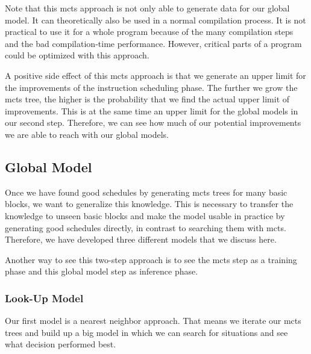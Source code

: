 Note that this \ac{mcts} approach is not only able to generate data for our global model.
It can theoretically also be used in a normal compilation process.
It is not practical to use it for a whole program because of the many compilation steps and the bad compilation-time performance.
However, critical parts of a program could be optimized with this approach.

A positive side effect of this \ac{mcts} approach is that we generate an upper limit for the improvements of the instruction scheduling phase.
The further we grow the \ac{mcts} tree, the higher is the probability that we find the actual upper limit of improvements.
This is at the same time an upper limit for the global models in our second step.
Therefore, we can see how much of our potential improvements we are able to reach with our global models.

\subsection{Global Model}
\label{subsec:approach:ml:global}
Once we have found good schedules by generating \ac{mcts} trees for many basic blocks, we want to generalize this knowledge.
This is necessary to transfer the knowledge to unseen basic blocks and make the model usable in practice by generating good schedules directly, in contrast to searching them with \ac{mcts}.
Therefore, we have developed three different models that we discuss here.

Another way to see this two-step approach is to see the \ac{mcts} step as a training phase and this global model step as inference phase.

\subsubsection{Look-Up Model}
Our first model is a nearest neighbor approach.
That means we iterate our \ac{mcts} trees and build up a big model in which we can search for situations and see what decision performed best.

